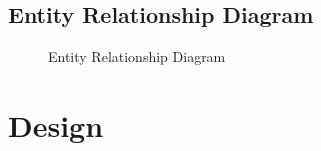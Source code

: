 \documentclass[a4paper]{article}
\begin{document}
\begin{landscape}
\clearpage
\subsection{Entity Relationship Diagram}
\begin{figure}[!ht] %
    \centering{} %
    \caption{Entity Relationship Diagram}
    \label{fig:erd}
\end{figure}
\end{landscape}

\section{Design}
\end{document}

